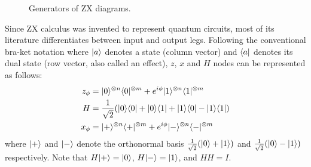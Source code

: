 \begin{figure}[ht]
	\centering
	
	\caption{Generators of ZX diagrams.}
	\label{fig:zx_generators}
\end{figure}

Since ZX calculus was invented to represent quantum circuits, most of its literature differentiates between input and output legs. 
Following the conventional bra-ket notation where $| a \rangle$ denotes a state (column vector) and $\langle a |$ denotes its dual state (row vector, also called an effect), $z$, $x$ and $H$ nodes can be represented as follows:
\begin{align*}
	z_{\phi} &= | 0 \rangle^{\otimes n}\langle 0 |^{\otimes m} + e^{i \phi} | 1 \rangle^{\otimes n}\langle 1 |^{\otimes m} \\
	H &=\frac{1}{\sqrt{2}}(| 0 \rangle\langle 0 | + | 0 \rangle\langle 1 | + | 1 \rangle\langle 0 | - | 1 \rangle\langle 1 |) \\
	x_{\phi} &=  | + \rangle^{\otimes n}\langle + |^{\otimes m} + e^{i \phi} | - \rangle^{\otimes n}\langle - |^{\otimes m}
\end{align*}
where $| + \rangle$ and $| - \rangle$ denote the orthonormal basis $\frac{1}{\sqrt{2}}(| 0 \rangle + | 1 \rangle)$ and $\frac{1}{\sqrt{2}}(| 0 \rangle - | 1 \rangle)$ respectively.
Note that $H| + \rangle = | 0 \rangle$, $H| - \rangle = | 1 \rangle$, and $HH = I$.


